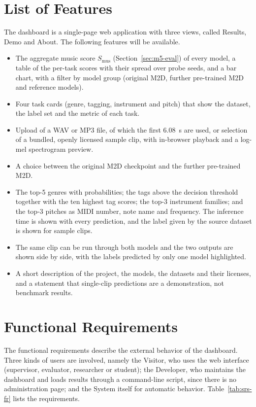 \documentclass{FastFyp}
\begin{document}
\section{List of Features}
\label{sec:srs-features}
The dashboard is a single-page web application with three views, called Results, Demo and About. The following features will be available.
\begin{itemize}
  \item The aggregate music score $S_{\mathrm{mus}}$ (Section~\ref{sec:m5-eval}) of every model, a table of the per-task scores with their spread over probe seeds, and a bar chart, with a filter by model group (original M2D, further pre-trained M2D and reference models).
  \item Four task cards (genre, tagging, instrument and pitch) that show the dataset, the label set and the metric of each task.
  \item Upload of a WAV or MP3 file, of which the first 6.08~s are used, or selection of a bundled, openly licensed sample clip, with in-browser playback and a log-mel spectrogram preview.
  \item A choice between the original M2D checkpoint and the further pre-trained M2D.
  \item The top-5 genres with probabilities; the tags above the decision threshold together with the ten highest tag scores; the top-3 instrument families; and the top-3 pitches as MIDI number, note name and frequency. The inference time is shown with every prediction, and the label given by the source dataset is shown for sample clips.
  \item The same clip can be run through both models and the two outputs are shown side by side, with the labels predicted by only one model highlighted.
  \item A short description of the project, the models, the datasets and their licenses, and a statement that single-clip predictions are a demonstration, not benchmark results.
\end{itemize}

\section{Functional Requirements}
\label{sec:srs-fr}
The functional requirements describe the external behavior of the dashboard. Three kinds of users are involved, namely the Visitor, who uses the web interface (supervisor, evaluator, researcher or student); the Developer, who maintains the dashboard and loads results through a command-line script, since there is no administration page; and the System itself for automatic behavior. Table~\ref{tab:srs-fr} lists the requirements.
\end{document}
